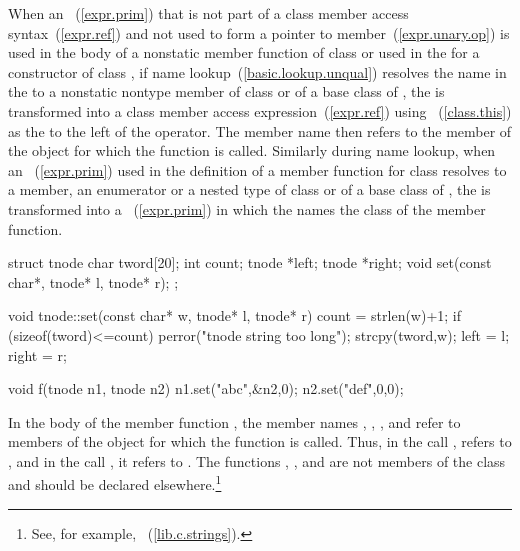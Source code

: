 \pnum
When an ~(\ref{expr.prim}) that is not part of a
class member access syntax~(\ref{expr.ref}) and not used to form a
pointer to member~(\ref{expr.unary.op}) is used in
the body of a nonstatic member function of class  or used in the
 for a constructor of class ,
if name
lookup~(\ref{basic.lookup.unqual}) resolves the name in the
 to a nonstatic nontype member of class
 or of a base class of ,
the  is transformed into a class
member access expression~(\ref{expr.ref}) using
~(\ref{class.this}) as the 
to the left of the  operator.
The member name then refers to the member of the object for which the
function is called.
Similarly during name lookup, when an
~(\ref{expr.prim}) used in the definition of a
member function for class  resolves to a  member,
an enumerator or a nested type of class  or of a base class of
, the  is transformed into a
~(\ref{expr.prim}) in which the
 names the class of the member function.
%
\enterexample

\begin{codeblock}
struct tnode {
	char tword[20];
	int count;
	tnode *left;
	tnode *right;
	void set(const char*, tnode* l, tnode* r);
};

void tnode::set(const char* w, tnode* l, tnode* r)
{
	count = strlen(w)+1;
	if (sizeof(tword)<=count)
		perror("tnode string too long");
	strcpy(tword,w);
	left = l;
	right = r;
}

void f(tnode n1, tnode n2)
{
	n1.set("abc",&n2,0);
	n2.set("def",0,0);
}
\end{codeblock}

In the body of the member function , the member names
, , , and  refer to
members of the object for which the function is called. Thus, in the
call ,  refers to
, and in the call , it refers
to . The functions , , and
 are not members of the class  and should be
declared elsewhere.\footnote{See, for example, ~(\ref{lib.c.strings}).}
\exitexample

